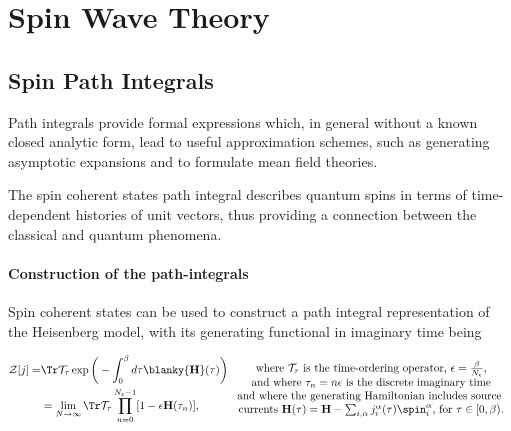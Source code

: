 \section{\textbf{Spin Wave Theory}}

\subsection{\textbf{Spin Path Integrals}}

Path integrals provide formal expressions which, in general without a known closed analytic form, lead to useful approximation schemes, such as generating asymptotic expansions and to formulate mean field theories. 

The spin coherent states path integral describes quantum spins in terms of time-dependent histories of unit vectors, thus providing a connection between the classical and quantum phenomena. \\

\paragraph{Construction of the path-integrals}

Spin coherent states can be used to construct a path integral representation of the Heisenberg model, with its generating functional in imaginary time being 

\begin{equation}
\begin{split}
    \mathcal{Z}[j] =& \Tr \mathcal{T}_{\tau} \exp \bigg(-\int_{0}^\beta d\tau \blanky {\bf H}(\tau)\bigg)  \\
    &= \lim_{N \rightarrow \infty} \Tr \mathcal{T}_{\tau} \prod_{n=0}^{N_{\epsilon} - 1} [1-\epsilon {\bf H}(\tau_n)],
\end{split} \begin{array}{cc}
         \textnormal{ where $\mathcal{T}_\tau$ is the time-ordering operator, $\epsilon = \frac{\beta}{N_{\epsilon}}$,}  \\
         \textnormal{  and where $\tau_n = n \epsilon$ is the discrete imaginary time} \\
         \textnormal{ and where the generating Hamiltonian includes source } \\
         \textnormal{ currents ${\bf H}(\tau) = {\bf H} - \sum_{i, \alpha} j_i^\alpha(\tau) \spin_i^\alpha$, for $\tau \in [0, \beta).$}
    \end{array}
\end{equation}

